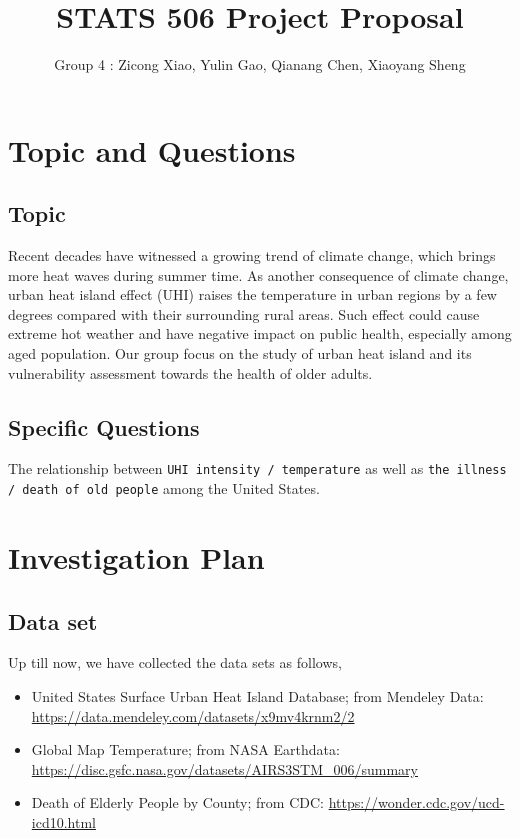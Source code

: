 \documentclass{article}
\title{STATS 506 Project Proposal} %
\author{Group 4 : Zicong Xiao, Yulin Gao, Qianang Chen, Xiaoyang Sheng}
\begin{document}
\maketitle %




\section{Topic and Questions}
\subsection{Topic}
Recent decades have witnessed a growing trend of climate change, which brings more heat waves during summer time. As another consequence of climate change, urban heat island effect (UHI) raises the temperature in urban regions by a few degrees compared with their surrounding rural areas. Such effect could cause extreme hot weather and have negative impact on public health, especially among aged population. Our group focus on the study of urban heat island and its vulnerability assessment towards the health of older adults.
\subsection{Specific Questions}
The relationship between \texttt{UHI intensity / temperature} as well as \texttt{the illness / death of old people} among the United States.
\section{Investigation Plan}
\subsection{Data set}
Up till now, we have collected the data sets as follows,
\begin{itemize}
    \item United States Surface Urban Heat Island Database; from Mendeley Data: \url{https://data.mendeley.com/datasets/x9mv4krnm2/2}
    \item Global Map Temperature; from NASA Earthdata: \url{https://disc.gsfc.nasa.gov/datasets/AIRS3STM_006/summary}
    \item Death of Elderly People by County; from CDC: \url{https://wonder.cdc.gov/ucd-icd10.html}
\end{itemize}
\end{document}
